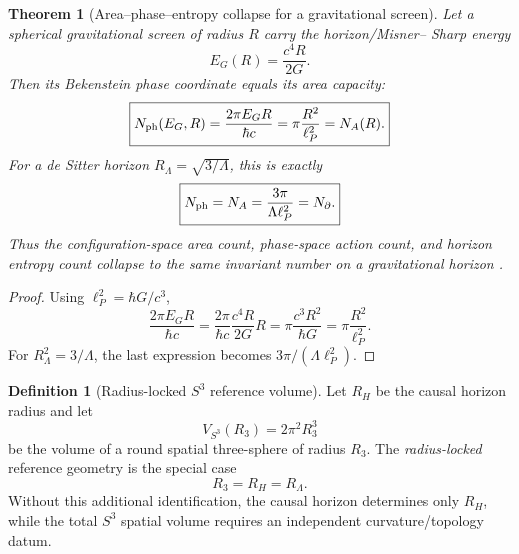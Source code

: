 \documentclass[aps,prd,reprint,nofootinbib,superscriptaddress,floatfix]{revtex4-2}
\numberwithin{equation}{section}
\theoremstyle{definition}
\newtheorem{definition}{Definition}[section]
\theoremstyle{plain}
\newtheorem{theorem}{Theorem}[section]
\begin{document}
\begin{theorem}[Area--phase--entropy collapse for a gravitational screen]
Let a spherical gravitational screen of radius \(R\) carry the horizon/Misner--
Sharp energy
\begin{equation}
E_G(R)=\frac{c^4R}{2G}.
\end{equation}
Then its Bekenstein phase coordinate equals its area capacity:
\begin{equation}
\boxed{
N_{\rm ph}(E_G,R)
=
\frac{2\pi E_G R}{\hbar c}
=
\pi\frac{R^2}{\ell_P^2}
=
N_A(R).
}
\end{equation}
For a de Sitter horizon \(R_\Lambda=\sqrt{3/\Lambda}\), this is exactly
\begin{equation}
\boxed{
N_{\rm ph}=N_A=\frac{3\pi}{\Lambda\ell_P^2}=N_\partial.
}
\end{equation}
Thus the configuration-space area count, phase-space action count, and
horizon entropy count collapse to the same invariant number on a gravitational
horizon \cite{Bekenstein1973,GibbonsHawking1977}.
\end{theorem}

\begin{proof}
Using \(\ell_P^2=\hbar G/c^3\),
\[
\frac{2\pi E_G R}{\hbar c}
=
\frac{2\pi}{\hbar c}\frac{c^4R}{2G}R
=
\pi\frac{c^3R^2}{\hbar G}
=
\pi\frac{R^2}{\ell_P^2}.
\]
For \(R_\Lambda^2=3/\Lambda\), the last expression becomes
\(3\pi/(\Lambda\ell_P^2)\).
\end{proof}


\begin{definition}[Radius-locked \texorpdfstring{\(S^3\)}{S3} reference volume]
Let \(R_H\) be the causal horizon radius and let
\[
V_{S^3}(R_3)=2\pi^2R_3^3
\]
be the volume of a round spatial three-sphere of radius \(R_3\).  The
\emph{radius-locked} reference geometry is the special case
\[
\boxed{
R_3=R_H=R_\Lambda .
}
\]
Without this additional identification, the causal horizon determines only
\(R_H\), while the total \(S^3\) spatial volume requires an independent
curvature/topology datum.
\end{definition}
\end{document}

